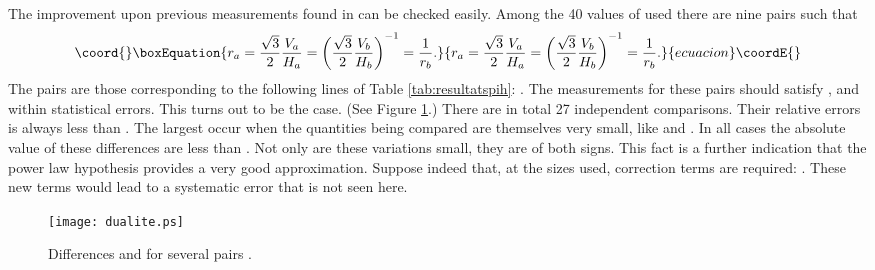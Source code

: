 \documentclass[a4paper,12pt]{article}
\begin{document}
The improvement upon previous measurements found in \cite{LLS} can be
checked easily. Among the 40 values of \coordHE{} used there are nine pairs
\coordHE{} such that 
\begin{equation*}\coord{}\boxEquation{
r_a=\frac{\sqrt3}2\frac{V_a}{H_a}=\left(\frac{\sqrt3}2\frac{V_b}{H_b}
\right)^{-1}=\frac1{r_b}.
}{
r_a=\frac{\sqrt3}2\frac{V_a}{H_a}=\left(\frac{\sqrt3}2\frac{V_b}{H_b}
\right)^{-1}=\frac1{r_b}.
}{ecuacion}\coordE{}\end{equation*}
The pairs \coordHE{} are those corresponding to the following
lines of Table \ref{tab:resultatspih}: \coordHE{}.
The measurements for these pairs should satisfy \coordHE{}, \coordHE{} and \coordHE{} within statistical errors. This turns out to be
the case. (See Figure \ref{fig:dua}.)
There are in total 27 independent comparisons. Their relative
errors is always less than \coordHE{}. The largest occur when the
quantities \myHighlight{$\hat\pi$}\coordHE{} being compared are themselves very small,
like \coordHE{} and \coordHE{}. In all cases the absolute value of
these differences are less than \coordHE{}. Not only
are these variations small, they are of both signs. This fact is 
a further indication that the power law hypothesis provides a very good
approximation. Suppose indeed that, at the sizes used, correction
terms are required: \coordHE{}.
These new terms would lead to a systematic error that is not seen here.


\begin{figure}
\begin{center}\leavevmode
\texttt{[image: dualite.ps]}
\end{center}
\caption{Differences \coordHE{} and
\coordHE{} for several pairs
\coordHE{}.\label{fig:dua}}
\end{figure}
\end{document}
